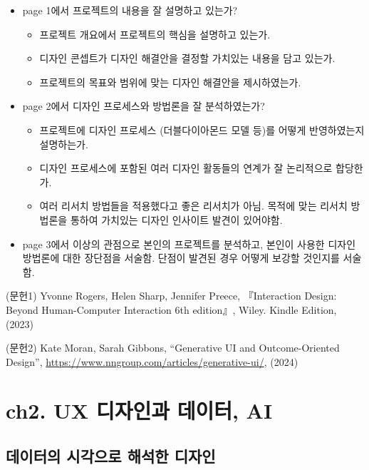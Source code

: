 \documentclass[
  letterpaper,
]{book}
\providecommand{\tightlist}{%
  \setlength{\itemsep}{0pt}\setlength{\parskip}{0pt}}\usepackage{longtable,booktabs,array}
\begin{document}
\begin{itemize}
\tightlist
\item
  page 1에서 프로젝트의 내용을 잘 설명하고 있는가?

  \begin{itemize}
  \tightlist
  \item
    프로젝트 개요에서 프로젝트의 핵심을 설명하고 있는가.
  \item
    디자인 콘셉트가 디자인 해결안을 결정할 가치있는 내용을 담고 있는가.
  \item
    프로젝트의 목표와 범위에 맞는 디자인 해결안을 제시하였는가.
  \end{itemize}
\item
  page 2에서 디자인 프로세스와 방법론을 잘 분석하였는가?

  \begin{itemize}
  \tightlist
  \item
    프로젝트에 디자인 프로세스 (더블다이아몬드 모델 등)를 어떻게
    반영하였는지 설명하는가.
  \item
    디자인 프로세스에 포함된 여러 디자인 활동들의 연계가 잘 논리적으로
    합당한가.
  \item
    여러 리서치 방법들을 적용했다고 좋은 리서치가 아님. 목적에 맞는
    리서치 방법론을 통하여 가치있는 디자인 인사이트 발견이 있어야함.
  \end{itemize}
\item
  page 3에서 이상의 관점으로 본인의 프로젝트를 분석하고, 본인이 사용한
  디자인 방법론에 대한 장단점을 서술함. 단점이 발견된 경우 어떻게 보강할
  것인지를 서술함.
\end{itemize}

(문헌1) Yvonne Rogers, Helen Sharp, Jennifer Preece, 『Interaction
Design: Beyond Human-Computer Interaction 6th edition』, Wiley. Kindle
Edition, (2023)

(문헌2) Kate Moran, Sarah Gibbons, ``Generative UI and Outcome-Oriented
Design'', \url{https://www.nngroup.com/articles/generative-ui/}, (2024)

\chapter{ch2. UX 디자인과 데이터,
AI}\label{ch2.-ux-uxb514uxc790uxc778uxacfc-uxb370uxc774uxd130-ai}

\section{데이터의 시각으로 해석한
디자인}\label{uxb370uxc774uxd130uxc758-uxc2dcuxac01uxc73cuxb85c-uxd574uxc11duxd55c-uxb514uxc790uxc778}
\end{document}
